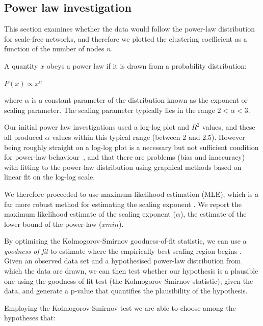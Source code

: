 \documentclass[twocolumn]{svjour3}          %
\theoremstyle{definition}
\begin{document}
\subsection{Power law investigation}\label{sec:powerlaw}

This section examines whether the data would follow the power-law
distribution for scale-free networks, and therefore we plotted the
clustering coefficient as a function of the number of nodes $n$.

\begin{definition}
A quantity $x$ obeys a power law if it is drawn from a probability
distribution:

\begin{center}
$ P(x)\propto x^{\alpha } $
\end{center}

\noindent where $\alpha$ is a constant parameter of the distribution
known as the exponent or scaling parameter. The scaling parameter
typically lies in the range $2 < \alpha < 3$.
\end{definition}

Our initial power law investigations used a log-log plot and $R^2$
values, and these all produced $\alpha$ values within this typical
range (between 2 and 2.5). However being roughly straight on a log-log
plot is a necessary but not sufficient condition for power-law
behaviour~\citep{ClausetShaliziNewman2009}, and that there are problems
(bias and inaccuracy) with fitting to the power-law distribution using
graphical methods based on linear fit on the log-log scale.

We therefore proceeded to use maximum likelihood estimation (MLE),
which is a far more robust method for estimating the scaling exponent
\citep{GoldsteinMorrisYen2004,ClausetShaliziNewman2009}. We report the
maximum likelihood estimate of the scaling exponent ($\alpha$), the
estimate of the lower bound of the power-law ($xmin$).

By optimising the Kolmogorov-Smirnov goodness-of-fit statistic, we can
use a \emph{goodness of fit} to estimate where the empirically-best
scaling region begins \citep{ClausetShaliziNewman2009}. Given an
observed data set and a hypothesised power-law distribution from which
the data are drawn, we can then test whether our hypothesis is a
plausible one using the goodness-of-fit test (the Kolmogorov-Smirnov
statistic), given the data, and generate a p-value that quantifies the
plausibility of the hypothesis.

Employing the Kolmogorov-Smirnov test we are able to choose among the
hypotheses that: 
\end{document}
